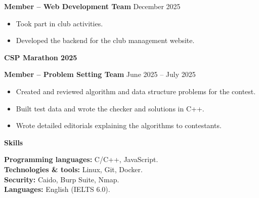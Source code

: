 \documentclass[11pt]{article}
\begin{document}
\textbf{Member -- Web Development Team} \hfill December 2025
\begin{itemize}[noitemsep, topsep=0pt, partopsep=0pt, parsep=0pt]
    \item Took part in club activities.
    \item Developed the backend for the club management website.
\end{itemize}

\vspace{12pt}

\textbf{CSP Marathon 2025}

\textbf{Member -- Problem Setting Team} \hfill June 2025 -- July 2025
\begin{itemize}[noitemsep, topsep=0pt, partopsep=0pt, parsep=0pt]
    \item Created and reviewed algorithm and data structure problems for the contest.
    \item Built test data and wrote the checker and solutions in C++.
    \item Wrote detailed editorials explaining the algorithms to contestants.
\end{itemize}

\begin{center}
    \textbf{Skills}
\end{center}

\textbf{Programming languages:} C/C++, JavaScript. \\
\textbf{Technologies \& tools:} Linux, Git, Docker. \\
\textbf{Security:} Caido, Burp Suite, Nmap. \\
\textbf{Languages:} English (IELTS 6.0). \\
\end{document}
